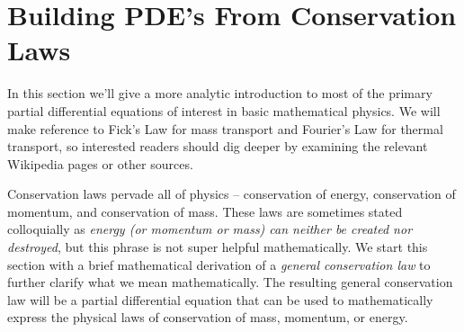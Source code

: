 % 


\newpage\section{Building PDE's From Conservation Laws}

In this section
we'll give a more analytic introduction to most of the primary partial
differential equations of interest in basic mathematical physics.  We will make reference
to Fick's Law for mass transport and Fourier's Law for thermal transport, so interested
readers should dig deeper by examining the relevant Wikipedia pages or other sources.
  
Conservation laws pervade all of physics -- conservation of energy, conservation of
momentum, and conservation of mass.  These laws are sometimes stated colloquially as
{\it energy (or momentum or mass) can neither be created nor destroyed}, but this phrase
is not super helpful mathematically.  We start this section with a brief mathematical
derivation of a {\it general conservation law} to further clarify what we mean
mathematically.  The resulting general conservation law will be a
partial differential equation that can be used to mathematically express the physical laws
of conservation of mass, momentum, or
energy.

